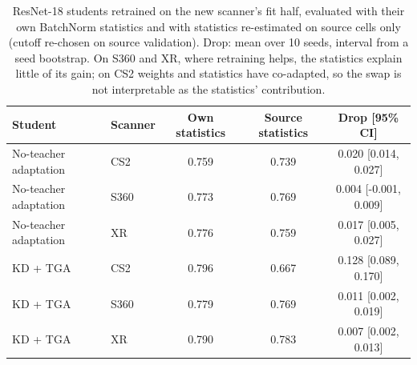 \begin{table}[htbp]
{\caption{ResNet-18 students retrained on the new scanner's fit half, evaluated with their own BatchNorm statistics and with statistics re-estimated on source cells only (cutoff re-chosen on source validation). Drop: mean over 10 seeds, interval from a seed bootstrap. On S360 and XR, where retraining helps, the statistics explain little of its gain; on CS2 weights and statistics have co-adapted, so the swap is not interpretable as the statistics' contribution.}}
{%
\scriptsize
\setlength{\tabcolsep}{3pt}
\begin{tabular}{@{}llccc@{}}
\toprule
Student & Scanner & Own statistics & Source statistics & Drop [95\% CI] \\
\midrule
No-teacher adaptation & CS2 & 0.759 & 0.739 & 0.020 [0.014, 0.027] \\
No-teacher adaptation & S360 & 0.773 & 0.769 & 0.004 [-0.001, 0.009] \\
No-teacher adaptation & XR & 0.776 & 0.759 & 0.017 [0.005, 0.027] \\
KD + TGA & CS2 & 0.796 & 0.667 & 0.128 [0.089, 0.170] \\
KD + TGA & S360 & 0.779 & 0.769 & 0.011 [0.002, 0.019] \\
KD + TGA & XR & 0.790 & 0.783 & 0.007 [0.002, 0.013] \\
\bottomrule
\end{tabular}
}
\end{table}
